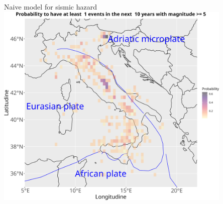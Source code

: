 \documentclass[aspectratio=43]{beamer}
\begin{document}
\begin{frame}{Naive model for sismic hazard}
	\centering
	\includegraphics[width=0.85\textwidth]{EQ_images/probability.png} \\
\end{frame}
\end{document}
